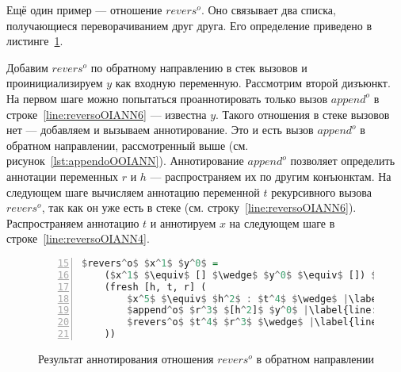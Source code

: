 Ещё один пример --- отношение $revers^o$.
Оно связывает два списка, получающиеся переворачиванием друг друга.
Его определение приведено в листинге~\ref{lst:reversoOIANN}.

Добавим $revers^o$ по обратному направлению в стек вызовов и проинициализируем $y$ как входную переменную.
Рассмотрим второй дизъюнкт.
На первом шаге можно попытаться проаннотировать только вызов $append^o$ в строке~\ref{line:reversoOIANN6} --- известна $y$.
Такого отношения в стеке вызовов нет --- добавляем и вызываем аннотирование.
Это и есть вызов $append^o$ в обратном направлении, рассмотренный выше (см. рисунок~\ref{lst:appendoOOIANN}).
Аннотирование $append^o$ позволяет определить аннотации переменных $r$ и $h$ --- распространяем их по другим конъюнктам.
На следующем шаге вычисляем аннотацию переменной $t$ рекурсивного вызова $revers^o$, так как он уже есть в стеке (см. строку~\ref{line:reversoOIANN6}).
Распространяем аннотацию $t$ и аннотируем $x$ на следующем шаге в строке~\ref{line:reversoOIANN4}.

\begin{figure}[h!]
  \begin{center}
  \begin{minipage}{0.4\textwidth}
  \begin{lstlisting}[language=Haskell, frame=single, numbers=left,numberstyle=\small, firstnumber=15, escapechar=|]
  $revers^o$ $x^1$ $y^0$ =
    ($x^1$ $\equiv$ [] $\wedge$ $y^0$ $\equiv$ []) $\vee$ |\label{line:reversoOIANN2}|
    (fresh [h, t, r] (
        $x^5$ $\equiv$ $h^2$ : $t^4$ $\wedge$ |\label{line:reversoOIANN4}|
        $append^o$ $r^3$ $[h^2]$ $y^0$ |\label{line:reversoOIANN5}|
        $revers^o$ $t^4$ $r^3$ $\wedge$ |\label{line:reversoOIANN6}|
    ))
    \end{lstlisting}
  \end{minipage}
  \end{center}
  \caption{Результат аннотирования отношения $revers^o$ в обратном направлении}
  \label{lst:reversoOIANN}
\end{figure}
